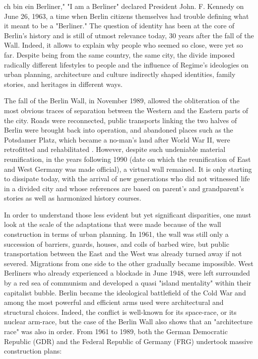 \label{ch:a-quest-for-identity-in-berlin}

ch bin ein Berliner," "I am a Berliner" declared President John. F.
   Kennedy on June 26, 1963, a time when Berlin citizens themselves had
   trouble defining what it meant to be a "Berliner." The question of
   identity has been at the core of Berlin's history and is still of
   utmost relevance today, 30 years after the fall of the Wall.  Indeed,
   it allows to explain why people who seemed so close, were yet so far.
   Despite being from the same country, the same city, the divide imposed
   radically different lifestyles to people and the influence of Regime's
   ideologies on urban planning, architecture and culture indirectly
   shaped identities, family stories, and heritages in different ways.

   The fall of the Berlin Wall, in November 1989, allowed the obliteration
   of the most obvious traces of separation between the Western and the
   Eastern parts of the city. Roads were reconnected, public transports
   linking the two halves of Berlin were brought back into operation, and
   abandoned places such as the Potsdamer Platz, which became a no-man's
   land after World War II, were retrofitted and rehabilitated . However,
   despite such undeniable material reunification, in the years following
   1990 (date on which the reunification of East and West Germany was made
   official), a virtual wall remained. It is only starting to dissipate
   today, with the arrival of new generations who did not witnessed life
   in a divided city and whose references are based on parent's and
   grandparent's stories as well as harmonized history courses.

   In order to understand those less evident but yet significant
   disparities, one must look at the scale of the adaptations that were
   made because of the wall construction in terms of urban planning. In
   1961, the wall was still only a succession of barriers, guards, houses,
   and coils of barbed wire, but public transportation between the East
   and the West was already turned away if not severed. Migrations from
   one side to the other gradually became impossible. West Berliners who
   already experienced a blockade in June 1948, were left surrounded by a
   red sea of communism and developed a quasi "island mentality" within
   their capitalist bubble. Berlin became the ideological battlefield of
   the Cold War and among the most powerful and efficient arms used were
   architectural and structural choices. Indeed, the conflict is
   well-known for its space-race, or its nuclear arm-race, but the case of
   the Berlin Wall  also shows that an "architecture race" was also in
   order. From 1961 to 1989, both the German Democratic Republic (GDR) and
   the Federal Republic of Germany (FRG) undertook massive construction
   plans:


